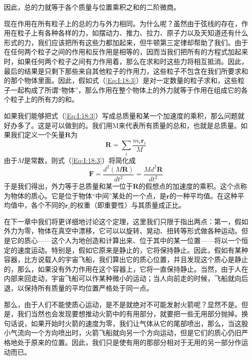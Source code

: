 因此，总的力就等于各个质量与位置乘积之和的二阶微商。

现在作用在所有粒子上的总的力与外力相同。为什么呢？虽然由于弦线的存在，作用在粒子上有各种各样的力，如摆动力、推力、拉力、原子力以及天知道还有什么形式的力，我们应该把所有这些力都加起来，但牛顿第三定律却帮助了我们。由于在任何两个粒子之间的作用和反作用是相等的，因而当我们把所有的方程式加起来时，如果任何两个粒子之间有力作用着，那么在求和时这些力将相互抵消。因此，最后的结果是只剩下那些来自其他粒子的作用力，这些粒子不包含在我们所要求和的那个物体里面。因此，假如式（\ref{Eq:I:18:3}）是对一定数量的粒子求和，这些粒子一起构成了所谓“物体”，那么作用在整个物体上的外力就等于作用在组成它的各个粒子上的所有力的和。

如果我们能够把式（\ref{Eq:I:18:3}）写成总质量和某一个加速度的乘积，那么问题就好办多了。这是可以做到的。我们用M来代表所有质量的总和，也就是总质量。如果我们定义一个矢量$\boldsymbol{R}$为
\begin{equation}
    \label{Eq:I:18:4}
    \boldsymbol{R}=\sum_i \frac{m_i\boldsymbol{r}_i}{M}
\end{equation}
由于$M$是常数，则式（\ref{Eq:I:18:3}）将简化成
\begin{equation}
    \label{Eq:I:18:5}
    \boldsymbol{F}=\frac{d^2(M\boldsymbol{R})}{dt^2}=\frac{Md^2\boldsymbol{R}}{dt^2}
\end{equation}
于是我们得出，外力等于总质量和某一位于$\boldsymbol{R}$的假想点的加速度的乘积。这个点称为物体的质心。它是位于物体“中间”某处的一个点，是$\boldsymbol{r}$的一种平均值。在这种平均值中，各个不同的$\boldsymbol{r}_i$的权重（即重要性）与其质量成正比。

在下一章中我们将更详细地讨论这个定理，这里我们只限于指出两点：第一，假如外力为零，物体在真空中漂移，它可以以旋转、晃动、扭转等形式做各种运动。但是它的质心——这个人为地创造和计算出来、位于其中的某一位置——将以一个恒定的速度运动。特别是，假如它原来是静止的，它将保持静止。因此，假如有某种容器，比方说载人的宇宙飞船，我们算出它的质心位置，并且发现这个质心是静止的，那么，如果没有外力作用在这个容器上，它将一直保持静止。当然，由于人在内部来回走动，宇宙飞船可以作某种微小的运动；当人向前走的时候，飞船就向后退，以保持所有质量的平均位置严格处于同一点。

那么，由于人们不能使质心运动，是不是就绝对不可能发射火箭呢？显然不是。但是，我们当然也会发现要想推动火箭中的有用部分，就要把一些无用部分抛掉。换句话说，如果开始时火箭的速度为零，我们让气体从它的尾部喷出，那么，当这股小气流向一个方向喷出时，火箭飞船就向另一个方向运动，但是它们的质心仍旧严格地处于原来的位置。因此，我们只是使有用的那部分相对于无用的另一部分作运动而已。


